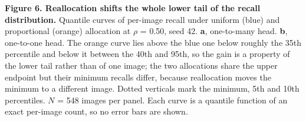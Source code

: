 \documentclass[sn-mathphys,Numbered]{sn-jnl}
\begin{document}
\textbf{Figure 6. Reallocation shifts the whole lower tail of the recall distribution.} Quantile curves of per-image recall under uniform (blue) and proportional (orange) allocation at $\rho$ = 0.50, seed 42. \textbf{a}, one-to-many head. \textbf{b}, one-to-one head. The orange curve lies above the blue one below roughly the 35th percentile and below it between the 40th and 95th, so the gain is a property of the lower tail rather than of one image; the two allocations share the upper endpoint but their minimum recalls differ, because reallocation moves the minimum to a different image. Dotted verticals mark the minimum, 5th and 10th percentiles. $N$ = 548 images per panel. Each curve is a quantile function of an exact per-image count, so no error bars are shown.


\end{document}
